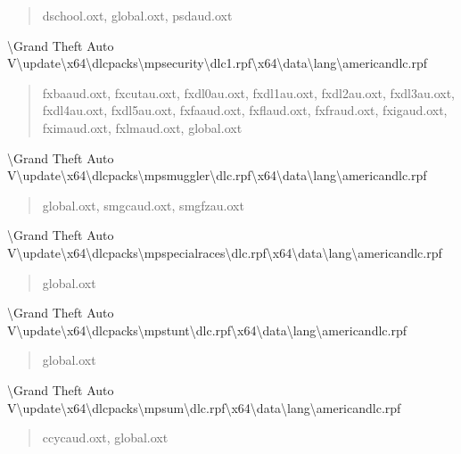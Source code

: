 \documentclass[]{scrartcl}
\begin{document}
\begin{quote}
   \ttfamily
   dschool.oxt, global.oxt, psdaud.oxt
\end{quote}

\textbackslash{}Grand Theft Auto V\textbackslash{}update\textbackslash{}x64\textbackslash{}dlcpacks\textbackslash{}mpsecurity\textbackslash{}dlc1.rpf\textbackslash{}x64\textbackslash{}data\textbackslash{}lang\textbackslash{}americandlc.rpf

\begin{quote}
   \ttfamily
   fxbaaud.oxt, fxcutau.oxt, fxdl0au.oxt, fxdl1au.oxt, fxdl2au.oxt, fxdl3au.oxt, fxdl4au.oxt, fxdl5au.oxt, fxfaaud.oxt, fxflaud.oxt, fxfraud.oxt, fxigaud.oxt, fximaud.oxt, fxlmaud.oxt, global.oxt
\end{quote}

\textbackslash{}Grand Theft Auto V\textbackslash{}update\textbackslash{}x64\textbackslash{}dlcpacks\textbackslash{}mpsmuggler\textbackslash{}dlc.rpf\textbackslash{}x64\textbackslash{}data\textbackslash{}lang\textbackslash{}americandlc.rpf

\begin{quote}
   \ttfamily
   global.oxt, smgcaud.oxt, smgfzau.oxt
\end{quote}

\textbackslash{}Grand Theft Auto V\textbackslash{}update\textbackslash{}x64\textbackslash{}dlcpacks\textbackslash{}mpspecialraces\textbackslash{}dlc.rpf\textbackslash{}x64\textbackslash{}data\textbackslash{}lang\textbackslash{}americandlc.rpf

\begin{quote}
   \ttfamily
   global.oxt
\end{quote}

\textbackslash{}Grand Theft Auto V\textbackslash{}update\textbackslash{}x64\textbackslash{}dlcpacks\textbackslash{}mpstunt\textbackslash{}dlc.rpf\textbackslash{}x64\textbackslash{}data\textbackslash{}lang\textbackslash{}americandlc.rpf

\begin{quote}
   \ttfamily
   global.oxt
\end{quote}

\textbackslash{}Grand Theft Auto V\textbackslash{}update\textbackslash{}x64\textbackslash{}dlcpacks\textbackslash{}mpsum\textbackslash{}dlc.rpf\textbackslash{}x64\textbackslash{}data\textbackslash{}lang\textbackslash{}americandlc.rpf

\begin{quote}
   \ttfamily
   ccycaud.oxt, global.oxt
\end{quote}
\end{document}
